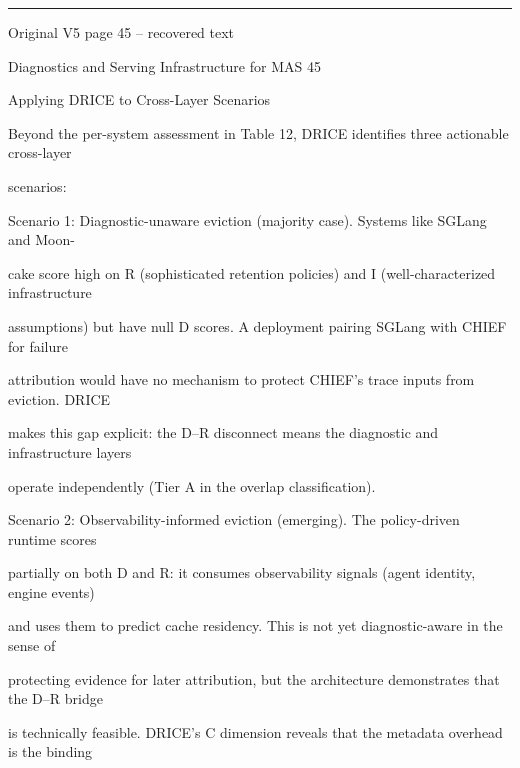 \par\smallskip\noindent\rule{\textwidth}{0.4pt}\par{\sffamily\footnotesize Original V5 page 45 -- recovered text}\par\begin{flushleft}\footnotesize\ttfamily
\par\smallskip
\par\smallskip
\noindent Diagnostics and Serving Infrastructure for MAS 45\par
\par\smallskip
\par\smallskip
\par\smallskip
{} Applying DRICE to Cross-Layer Scenarios\par
\noindent Beyond the per-system assessment in Table 12, DRICE identifies three actionable cross-layer\par
\noindent scenarios:\par
\par\smallskip
\noindent Scenario 1: Diagnostic-unaware eviction (majority case). Systems like SGLang and Moon-\par
\noindent cake score high on R (sophisticated retention policies) and I (well-characterized infrastructure\par
\noindent assumptions) but have null D scores. A deployment pairing SGLang with CHIEF for failure\par
\noindent attribution would have no mechanism to protect CHIEF’s trace inputs from eviction. DRICE\par
\noindent makes this gap explicit: the D–R disconnect means the diagnostic and infrastructure layers\par
\noindent operate independently (Tier A in the overlap classification).\par
\par\smallskip
\noindent Scenario 2: Observability-informed eviction (emerging). The policy-driven runtime scores\par
\noindent partially on both D and R: it consumes observability signals (agent identity, engine events)\par
\noindent and uses them to predict cache residency. This is not yet diagnostic-aware in the sense of\par
\noindent protecting evidence for later attribution, but the architecture demonstrates that the D–R bridge\par
\noindent is technically feasible. DRICE’s C dimension reveals that the metadata overhead is the binding\par

\end{flushleft}
